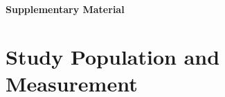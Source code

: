 \clearpage
\appendix
\raggedbottom
\setlength{\intextsep}{7pt plus 2pt minus 2pt}
\setlength{\textfloatsep}{9pt plus 2pt minus 2pt}
\setlength{\floatsep}{9pt plus 2pt minus 2pt}
\renewcommand{\thesection}{S\arabic{section}}\renewcommand{\theHsection}{S\arabic{section}}
\setcounter{figure}{0}
\setcounter{table}{0}

\newcommand{\cf}[1]{\textsf{\bfseries #1:}}
\newcommand{\unverified}{\textit{(archived, not independently recomputed)}}

\newcommand{\suppbox}[2]{%
  \par\smallskip\noindent{\setlength{\fboxsep}{7pt}%
  \fcolorbox{black!25}{black!2}{%
    \begin{minipage}{\dimexpr\linewidth-2\fboxsep-2\fboxrule\relax}%
      \footnotesize\textbf{#1}\par\smallskip #2%
    \end{minipage}}}%
  \par\smallskip}
\begin{center}
{\Large\bfseries Supplementary Material}
\end{center}

\section{Study Population and Measurement}\label{sec:s1}

